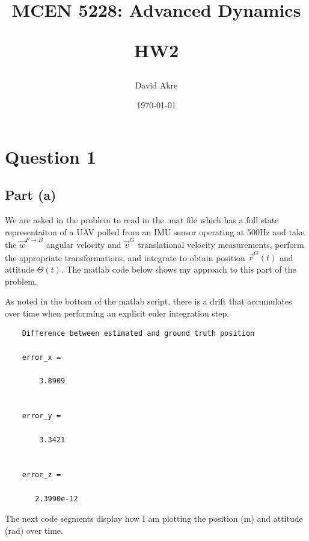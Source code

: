 \documentclass{article}
\title{MCEN 5228: Advanced Dynamics

HW2}
\author{David Akre}
\date{\today}
\begin{document}
\maketitle

\section{Question 1}

\subsection{Part (a)}

We are asked in the problem to read in the .mat file which has a full state representaiton of a UAV polled from an IMU sensor operating at 500Hz and take the $\vec{w}^{F \to B}$ angular velocity and $\vec{v}^G$ translational velocity measurements, perform the appropriate transformations, and integrate to obtain position $\vec{r}^G(t)$ and attitude $\Theta(t)$. The matlab code below shows my approach to this part of the problem.



As noted in the bottom of the matlab script, there is a drift that accumulates over time when performing an explicit euler integration step.

\begin{verbatim}
    Difference between estimated and ground truth position

    error_x =
    
        3.8909
    
    
    error_y =
    
        3.3421
    
    
    error_z =
    
       2.3990e-12
\end{verbatim}

The next code segments display how I am plotting the position (m) and attitude (rad) over time.



\end{document}
